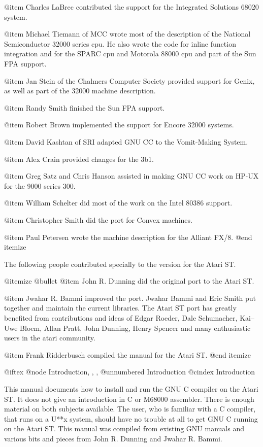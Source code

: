 @item
Charles LaBrec contributed the support for the Integrated Solutions
68020 system.

@item
Michael Tiemann of MCC wrote most of the description of the National
Semiconductor 32000 series cpu.  He also wrote the code for inline
function integration and for the SPARC cpu and Motorola 88000 cpu
and part of the Sun FPA support.

@item
Jan Stein of the Chalmers Computer Society provided support for
Genix, as well as part of the 32000 machine description.

@item
Randy Smith finished the Sun FPA support.

@item
Robert Brown implemented the support for Encore 32000 systems.

@item
David Kashtan of SRI adapted GNU CC to the Vomit-Making System.

@item
Alex Crain provided changes for the 3b1.

@item
Greg Satz and Chris Hanson assisted in making GNU CC work on HP-UX for
the 9000 series 300.

@item
William Schelter did most of the work on the Intel 80386 support.

@item
Christopher Smith did the port for Convex machines.

@item
Paul Petersen wrote the machine description for the Alliant FX/8.
@end itemize

The following people contributed specially to the version for the
Atari ST.

@itemize @bullet
@item
John R. Dunning did the original port to the Atari ST.

@item
Jwahar R. Bammi improved the port. Jwahar Bammi and Eric Smith put
together and maintain the current libraries. The Atari ST port has greatly
benefited from contributions and ideas of Edgar Roeder, Dale Schumacher,
Kai--Uwe Bloem, Allan Pratt, John Dunning, Henry Spencer and many 
enthusiastic users in the atari community.

@item
Frank Ridderbusch compiled the manual for the Atari ST.
@end itemize

@iftex
@node     Introduction, , , 
@unnumbered Introduction
@cindex Introduction

This manual documents how to install and run the GNU C compiler on the
Atari ST. It does not give an introduction in C or M68000 assembler.
There is enough material on both subjects available. The user, who is
familiar with a C compiler, that runs on a U**x system, should have no
trouble at all to get GNU C running on the Atari ST. This manual was
compiled from existing GNU manuals and various bits and pieces from John
R. Dunning and Jwahar R. Bammi. 

